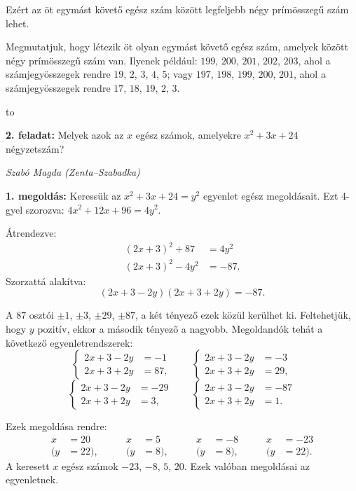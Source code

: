 \documentclass[a4paper,10pt]{article}
\newcommand{\ki}[2]{\hfill {\it #1 (#2)}\medskip}
\newcommand{\vonal}{\hbox to \hsize{\hskip2truecm\hrulefill\hskip2truecm}}
\begin{document}
\noindent Ezért az öt egymást követő egész szám között legfeljebb négy prímösszegű szám lehet.

\smallskip

\noindent Megmutatjuk, hogy létezik öt olyan egymást követő egész szám, amelyek között négy prímösszegű szám van.
Ilyenek például: $199$, $200$, $201$, $202$, $203$, ahol a számjegyösszegek rendre $19$, $2$, $3$, $4$, $5$; vagy $197$, $198$, $199$, $200$, $201$, ahol a számjegyösszegek rendre $17$, $18$, $19$, $2$, $3$.

\vonal

{\bf 2. feladat: } Melyek azok az $x$ egész számok, amelyekre $x^2+3x+24$ négyzetszám?

\ki{Szabó Magda}{Zenta--Szabadka}\medskip

{\bf 1. megoldás: } Keressük az $x^2+3x+24=y^2$ egyenlet egész megoldásait. Ezt 4-gyel szorozva:  $4x^2+12x+96=4y^2$. \hfill 

\smallskip

\noindent Átrendezve:
\begin{align*}
(2x+3)^2+87&=4y^2\\(2x+3)^2-4y^2&=-87.
\end{align*} 
Szorzattá alakítva:
\[(2x+3-2y)(2x+3+2y)=-87.\]

\noindent A $87$ osztói $\pm1$, $\pm3$, $\pm29$, $\pm87$, a két tényező ezek közül kerülhet ki.
Feltehetjük, hogy $y$ pozitív, ekkor a második tényező a nagyobb.
Megoldandók tehát a következő egyenletrendszerek:
\[
\left\{\begin{aligned}2x+3-2y&=-1\\2x+3+2y&=87,\end{aligned}\right.\qquad
\left\{\begin{aligned}2x+3-2y&=-3\\2x+3+2y&=29,\end{aligned}\right.\]
\[\left\{\begin{aligned}2x+3-2y&=-29\\2x+3+2y&=3,\end{aligned}\right.\qquad
\left\{\begin{aligned}2x+3-2y&=-87\\2x+3+2y&=1.\end{aligned}\right.
\]


\noindent Ezek megoldása rendre:
\[\begin{aligned}x&=20\\(y&=22),\end{aligned}\qquad
\begin{aligned}x&=5\\(y&=8),\end{aligned}\qquad
\begin{aligned}x&=-8\\(y&=8),\end{aligned}\qquad
\begin{aligned}x&=-23\\(y&=22).\end{aligned}
\] 
A keresett $x$ egész számok $-23$, $-8$, $5$, $20$. Ezek valóban megoldásai az egyenletnek.
\end{document}
